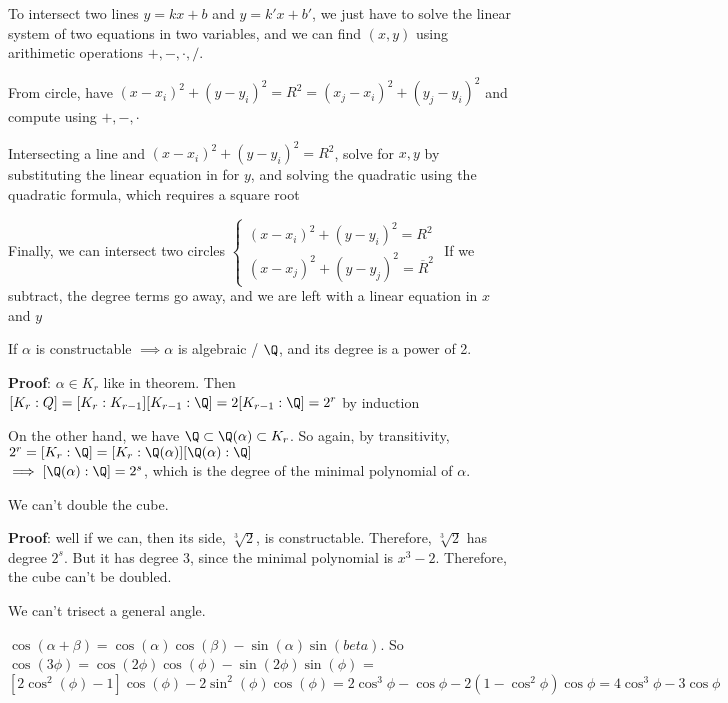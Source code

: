 \documentclass[10pt]{article}
\begin{document}
To intersect two lines $y = kx + b$ and $y = k'x + b'$, we just have to solve the linear system of two equations in two variables, and we can find $(x, y)$ using arithimetic operations $+, -, \cdot, /$.

From circle, have $(x - x_i)^2 + (y - y_i)^2 = R^2 = (x_j - x_i)^2 + (y_j - y_i)^2$ and compute using $+, -, \cdot$

Intersecting a line and $(x - x_i)^2 + (y - y_i)^2 = R^2$, solve for $x, y$ by substituting the linear equation in for $y$, and solving the quadratic using the quadratic formula, which requires a square root

Finally, we can intersect two circles $\begin{cases}
    (x - x_i)^2 + (y - y_i)^2 = R^2\\
    (x - x_j)^2 + (y - y_j)^2 = \overline{R}^2
\end{cases}$
If we subtract, the degree terms go away, and we are left with a linear equation in $x$ and $y$
\begin{cor}
    If $\alpha$ is constructable $\implies \alpha$ is algebraic / $\Q$, and its degree is a power of 2.
\end{cor}
\textbf{Proof}: $\alpha \in K_r$ like in theorem. Then $[K_r : Q] = [K_r:K_{r-1}][K_{r-1}:\Q] = 2[K_{r-1}:\Q] = 2^r$ by induction

On the other hand, we have $\Q \subset \Q(\alpha) \subset K_r$. So again, by transitivity, $2^r = [K_r : \Q] = [K_r: \Q(\alpha)][\Q(\alpha) : \Q]$\\
$\implies [\Q(\alpha):\Q] = 2^s$, which is the degree of the minimal polynomial of $\alpha$.

\begin{cor}
    We can't double the cube.
\end{cor}
\textbf{Proof}: well if we can, then its side, $\sqrt[3]{2}$, is constructable. Therefore, $\sqrt[3]{2}$ has degree $2^s$. But it has degree 3, since the minimal polynomial is $x^3 - 2$. Therefore, the cube can't be doubled.

\begin{cor}
    We can't trisect a general angle.
\end{cor}
$\cos(\alpha + \beta) = \cos(\alpha)\cos(\beta) -\sin(\alpha)\sin(beta)$. So $\cos(3\phi) = \cos(2\phi)\cos(\phi) - \sin(2\phi)\sin(\phi)$ =\\ $[2\cos^2(\phi)-1]\cos(\phi) - 2\sin^2(\phi)\cos(\phi) = 2\cos^3\phi - \cos\phi - 2(1 - \cos^2\phi)\cos\phi = 4\cos^3\phi - 3\cos\phi$
\end{document}
